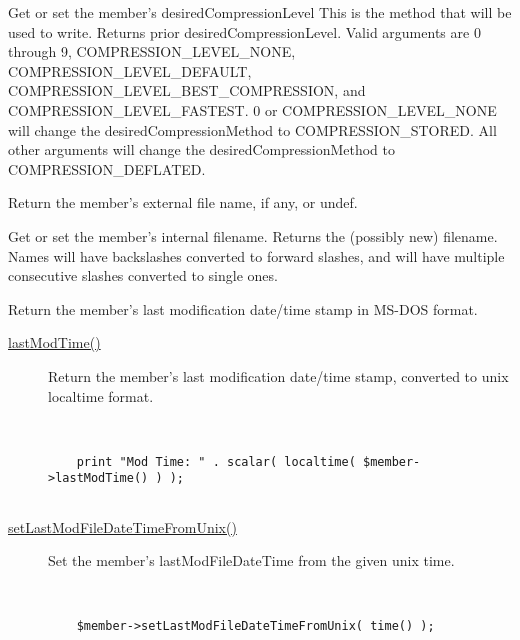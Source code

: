 \documentclass[]{article}
\renewcommand{\emph}[1]{\underline{#1}}
\begin{document}
\begin{description}
\itemsep1pt\parskip0pt
\item[desiredCompressionLevel( {[}\$method{]} )]
Get or set the member's desiredCompressionLevel This is the method that
will be used to write. Returns prior desiredCompressionLevel. Valid
arguments are 0 through 9, COMPRESSION\_LEVEL\_NONE,
COMPRESSION\_LEVEL\_DEFAULT, COMPRESSION\_LEVEL\_BEST\_COMPRESSION, and
COMPRESSION\_LEVEL\_FASTEST. 0 or COMPRESSION\_LEVEL\_NONE will change
the desiredCompressionMethod to COMPRESSION\_STORED. All other arguments
will change the desiredCompressionMethod to COMPRESSION\_DEFLATED.
\end{description}

\begin{description}
\itemsep1pt\parskip0pt
\item[\emph{externalFileName()}]
Return the member's external file name, if any, or undef.
\end{description}

\begin{description}
\itemsep1pt\parskip0pt
\item[\emph{fileName()}]
Get or set the member's internal filename. Returns the (possibly new)
filename. Names will have backslashes converted to forward slashes, and
will have multiple consecutive slashes converted to single ones.
\end{description}

\begin{description}
\itemsep1pt\parskip0pt
\item[\emph{lastModFileDateTime()}]
Return the member's last modification date/time stamp in MS-DOS format.
\end{description}

\begin{description}
\item[\emph{lastModTime()}]
Return the member's last modification date/time stamp, converted to unix
localtime format.

~

\begin{verbatim}
    print "Mod Time: " . scalar( localtime( $member->lastModTime() ) );
    
\end{verbatim}
\end{description}

\begin{description}
\item[\emph{setLastModFileDateTimeFromUnix()}]
Set the member's lastModFileDateTime from the given unix time.

~

\begin{verbatim}
    $member->setLastModFileDateTimeFromUnix( time() );
    
\end{verbatim}
\end{description}
\end{document}
